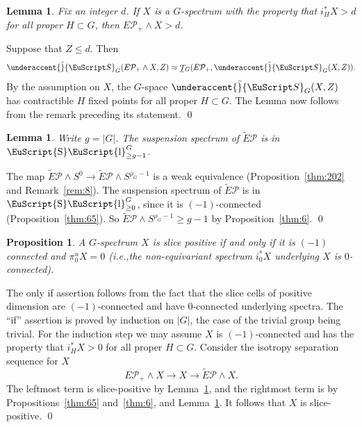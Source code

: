 \documentclass{amsart}
\newtheorem{lem}[equation]{Lemma}
\newtheorem{prop}[equation]{Proposition}
\theoremstyle{definition}
\theoremstyle{remark}
\newenvironment{pf}{\bigskip{\em Proof:\/}}{\qed\medskip}
\newcommand{\spectra}{\EuScript S}
\DeclareMathOperator{\slicesymbol}{\EuScript{S}\EuScript{l}}
\newcommand{\geslice}[1]{\slicesymbol^{G}_{\ge{#1}}}
\DeclareMathOperator{\spaces}{\mathcal T}
\newcommand{\piu}{\pi^{u}}
\newcommand{\gspaces}[1]{\underline{\spaces\mkern-4mu}\mkern4mu_{\!#1}}
\newcommand{\gspectra}[1]{\underaccent{\bar}{\spectra}_{#1}}
\newcommand{\ie}{i.e.,}
\newcommand{\pfamily}{\mathcal P}
\begin{document}
\begin{lem}
\label{thm:74}
Fix an integer $d$.  If $X$ is a $G$-spectrum with the property that
$i_{H}^{\ast}X>d$ for all proper $H\subset G$, then
$E\pfamily_{+}\wedge X>d$.
\end{lem}

\begin{pf}
Suppose that $Z\le d$.  Then 
\[
\gspectra{G}(E\pfamily_{+}\wedge X,Z) \approx
\gspaces{G}(E\pfamily_{+},\gspectra{G}(X,Z)).
\]
By the assumption on $X$, the $G$-space $\gspectra{G}(X,Z)$ has
contractible $H$ fixed points for all proper $H\subset G$.    The
Lemma now follows from the remark preceding its statement.
\end{pf}

\begin{lem}
\label{thm:75} Write $g=|G|$.  The suspension spectrum of $\tilde
E\pfamily$ is in $\geslice{g-1}$.
\end{lem}

\begin{pf}
The map $\tilde E\pfamily\wedge S^{0}\to \tilde E\pfamily\wedge
S^{\rho_{G}-1}$ is a weak equivalence (Proposition~\ref{thm:202} and
Remark~\ref{rem:8}).  The suspension spectrum of $\tilde E\pfamily$ is
in $\geslice{0}$, since it is $(-1)$-connected
(Proposition~\ref{thm:65}).  So $\tilde E\pfamily\wedge
S^{\rho_{G}-1}\ge g-1$ by Proposition~\ref{thm:6}.
\end{pf}



\begin{prop}
\label{thm:64} 
A $G$-spectrum $X$ is slice positive if and only if it
is $(-1)$ connected and $\piu_{0}X=0$ (\ie the non-equivariant
spectrum $i_{0}^{\ast}X$ underlying $X$ is $0$-connected).
\end{prop}

\begin{pf}
The only if assertion follows from the fact that the slice cells of
positive dimension are $(-1)$-connected and have $0$-connected
underlying spectra.  The ``if'' assertion is proved by induction on
$|G|$, the case of the trivial group being trivial.  For the induction
step we may assume $X$ is $(-1)$-connected and has the property that
$i_{H}^{\ast}X>0$ for all proper $H\subset G$.  Consider the isotropy
separation sequence for $X$
\[
E\pfamily_{+}\wedge X\to X\to \tilde E\pfamily \wedge X.
\]
The leftmost term is slice-positive by Lemma~\ref{thm:74}, and the
rightmost term is by Propositions~\ref{thm:65} and~\ref{thm:6}, and
Lemma~\ref{thm:75}.  It follows that $X$ is slice-positive.
\end{pf}
\end{document}
